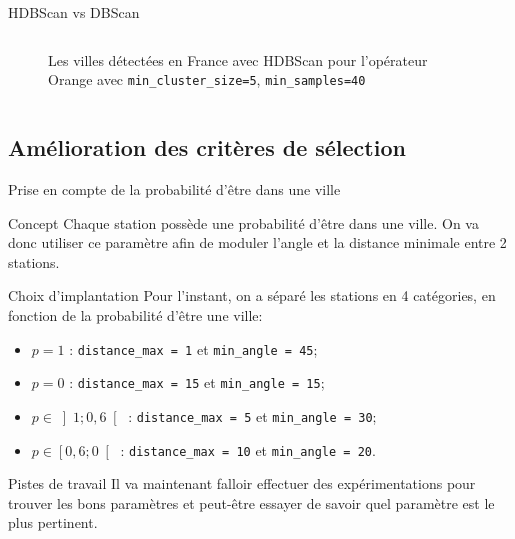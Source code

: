 \begin{frame}{HDBScan vs DBScan}
\begin{columns}
\begin{column}{0.5\textwidth}
\begin{figure}
                \caption{\label{fig:HDBSCAN}Les villes détectées en France avec HDBScan pour l'opérateur Orange avec \texttt{min\_cluster\_size=5}, \texttt{min\_samples=40}}
            \end{figure}
        \end{column}
    \end{columns}
\end{frame}

\subsection{Amélioration des critères de sélection}
\insertsubsectionframe

\begin{frame}{Prise en compte de la probabilité d'être dans une ville}
    \begin{block}{Concept}
        Chaque station possède une probabilité d'être dans une ville.
        On va donc utiliser ce paramètre afin de moduler l'angle et la distance minimale entre 2 stations.
    \end{block}

    \begin{block}{Choix d'implantation}
        Pour l'instant, on a séparé les stations en 4 catégories, en fonction de la probabilité d'être une ville:
        \begin{itemize}
            \item $p=1$ : \texttt{distance\_max = 1} et \texttt{min\_angle = 45};
            \item $p=0$ : \texttt{distance\_max = 15} et \texttt{min\_angle = 15};
            \item $p\in\left]1 ; 0,6\right[$ : \texttt{distance\_max = 5} et \texttt{min\_angle = 30};
            \item $p\in\left[0,6 ; 0\right[$ : \texttt{distance\_max = 10} et \texttt{min\_angle = 20}.
        \end{itemize}
    \end{block}
    
    \begin{alertblock}{Pistes de travail}
        Il va maintenant falloir effectuer des expérimentations pour trouver les bons paramètres et peut-être essayer de savoir quel paramètre est le plus pertinent.
    \end{alertblock}
\end{frame}

